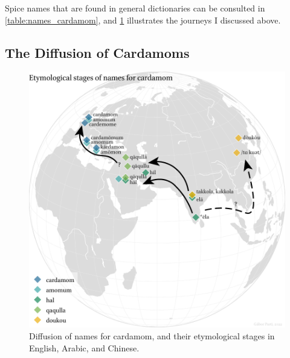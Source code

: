 Spice names that are found in general dictionaries can be consulted in \cref{table:names_cardamom}, and \cref{fig:diffusion_cardamom} illustrates the journeys I discussed above. 



\subsection{The Diffusion of Cardamoms}

\begin{figure}[ht]
    \centering
    \includegraphics[width=\textwidth]{imgs/plots/diffusion_cardamom_edited.pdf}
    \caption[Diffusion of names for cardamom, and their etymological stages.]{Diffusion of names for cardamom, and their etymological stages in English, Arabic, and Chinese.}
    \label{fig:diffusion_cardamom}
\end{figure}








